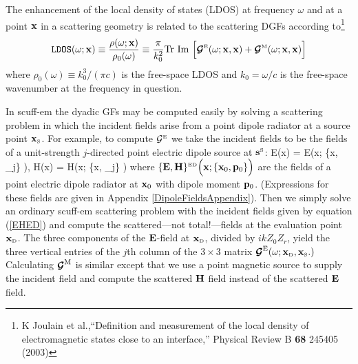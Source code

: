 \documentclass[letterpaper]{article}
\begin{document}
The enhancement of the local density of states (LDOS)
at frequency $\omega$ and at a point $\mathbf{x}$ in a 
scattering geometry is related to the scattering DGFs according 
to\footnote{K Joulain et al.,``Definition and measurement of the local 
density of electromagnetic states close to an interface,''
Physical Review B \textbf{68} 245405 (2003)}
$$
   \texttt{LDOS}(\omega; \mathbf{x})
   \equiv 
   \frac{\rho(\omega; \mathbf{x})}{\rho_0(\omega)}
   \equiv 
   \frac{\pi}{k_0^2}\text{Tr }\text{Im }
   \Big[ \boldsymbol{\mathcal{G}}^{\hbox{\tiny{E}}}(\omega; \mathbf{x}, \mathbf{x})
        +\boldsymbol{\mathcal{G}}^{\hbox{\tiny{M}}}(\omega; \mathbf{x}, \mathbf{x})
   \Big]
$$
where $\rho_0(\omega)\equiv k^3_0/(\pi c)$ is the free-space
LDOS and $k_0=\omega/c$ is the free-space wavenumber at the
frequency in question.

In {\sc scuff-em} the dyadic GFs may be computed easily by solving a
scattering problem in which the incident fields arise from a point dipole
radiator at a source point $\mathbf{x}_{\hbox{\tiny{S}}}$.
For example, to compute $\mathcal{G}^{\hbox{\tiny{E}}}$ we take the incident fields 
to be the fields of a unit-strength $j$-directed point electric dipole 
source at $\mathbf{s}^{\hbox{\tiny{S}}}$:
{
 \vb E(\vb x) =
 \vb E\Big(\vb x; \{\vb x, _j\} \Big),
 \qquad
 \vb H(\vb x) =
 \vb H\Big(\vb x; \{\vb x, _j\} \Big)
}
where $\{\mathbf{E}, \mathbf{H}\}^{\hbox{\tiny{ED}}}\Big(\mathbf{x}; \{\mathbf{x}_0, \mathbf{p}_0\}\Big)$
are the fields of a point electric dipole radiator 
at $\mathbf{x}_0$ with dipole moment $\mathbf{p}_0$. 
(Expressions for these fields are given in 
Appendix \ref{DipoleFieldsAppendix}).
Then we simply solve an ordinary {\sc scuff-em} scattering
problem with the incident fields given by equation 
(\ref{EHED}) and compute the scattered---not total!---fields
at the evaluation point $\mathbf{x}_{\hbox{\tiny{D}}}$. The three components of the
$\mathbf{E}$-field at $\mathbf{x}_{\hbox{\tiny{D}}}$, divided by $ikZ_0 Z_r$, yield the
three vertical entries of the $j$th column of the
$3\times 3$ matrix 
$\boldsymbol{\mathcal{G}}^{\hbox{\scriptsize{E}}}(\omega; \mathbf{x}_{\hbox{\tiny{D}}}, \mathbf{x}_{\hbox{\tiny{S}}}.)$
Calculating $\boldsymbol{\mathcal{G}}^{\hbox{\scriptsize{M}}}$ is similar except that we use 
a point magnetic source to supply the incident field 
and compute the scattered $\mathbf{H}$ field instead of the 
scattered $\mathbf{E}$ field.

\newpage
\end{document}
